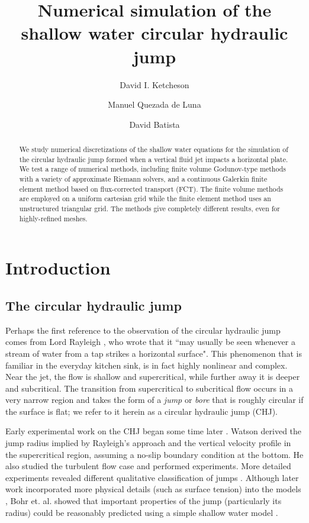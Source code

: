 \documentclass{article}
\title{Numerical simulation of the shallow water circular hydraulic jump}
\author{
    David I. Ketcheson \and
    Manuel Quezada de Luna \and
    David Batista
}
\begin{document}
\maketitle

\begin{abstract}
We study numerical discretizations of the shallow water equations
for the simulation of the circular hydraulic jump formed
when a vertical fluid jet impacts a horizontal plate.  
We test a range of numerical methods, including finite volume Godunov-type
methods with a variety of approximate Riemann solvers, and
a continuous Galerkin finite element method based on flux-corrected transport (FCT).
The finite volume methods are employed on a uniform cartesian grid
while the finite element method uses an unstructured triangular grid.
The methods give completely different results, even for highly-refined meshes.
\end{abstract}


\section{Introduction}

\subsection{The circular hydraulic jump}

Perhaps the first reference to the observation of the circular hydraulic jump
comes from Lord Rayleigh \cite{rayleigh1914theory}, who wrote that it
``may usually be seen whenever a stream of water from a tap strikes a horizontal
surface".  This phenomenon that is familiar in the everyday kitchen sink, is in
fact highly nonlinear and complex.  Near the jet, the flow is shallow and
supercritical, while further away it is deeper and subcritical.  The transition from supercritical
to subcritical flow
occurs in a very narrow region and takes the form of a \emph{jump} or \emph{bore}
that is roughly circular if the surface is flat; we refer to it herein as a
circular hydraulic jump (CHJ).

Early experimental work on the CHJ began some time later
\cite{kurihara1946hydraulic,tani1949water,watson1964radial}.
Watson \cite{watson1964radial} derived the jump radius
implied by Rayleigh's approach and the vertical
velocity profile in the supercritical region, assuming a no-slip
boundary condition at the bottom.  He also studied the turbulent
flow case and performed experiments.
More detailed experiments revealed different qualitative classification
of jumps  \cite{ishigai1977heat,craik1981circular}.
Although later work incorporated more physical details (such as surface tension) into the models
\cite{bush2003influence}, Bohr et. al. showed that important properties of the jump
(particularly its radius) could be reasonably predicted using a simple shallow water
model \cite{bohr1993shallow}.
\end{document}
